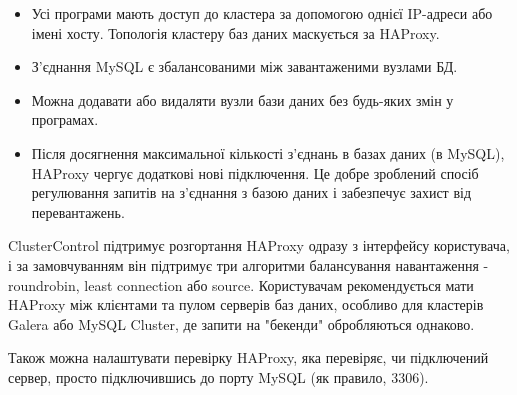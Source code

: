 \documentclass[14pt]{vakthesis}
\begin{document}
\begin{itemize}
\item Усі програми мають доступ до кластера за допомогою однієї IP-адреси або імені хосту. Топологія кластеру баз даних маскується за HAProxy.
\item З'єднання MySQL є збалансованими між завантаженими вузлами БД.
\item Можна додавати або видаляти вузли бази даних без будь-яких змін у програмах. 
\item Після досягнення максимальної кількості з'єднань в базах даних (в MySQL), HAProxy чергує додаткові нові підключення. Це добре зроблений спосіб регулювання запитів на з'єднання з базою даних і забезпечує захист від перевантажень.

\end{itemize}

ClusterControl підтримує розгортання HAProxy одразу з інтерфейсу користувача, і за замовчуванням він підтримує три алгоритми балансування навантаження - roundrobin, least connection або source. Користувачам рекомендується мати HAProxy між клієнтами та пулом серверів баз даних, особливо для кластерів Galera або MySQL Cluster, де запити на "бекенди" обробляються однаково.

Також можна налаштувати перевірку HAProxy, яка перевіряє, чи підключений сервер, просто підключившись до порту MySQL (як правило, 3306).
\end{document}
